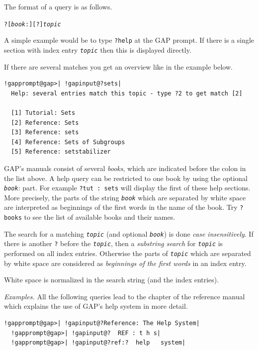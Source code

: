 \documentclass[a4paper,11pt]{report}
\begin{document}
{{ The format of a query is as follows. 

 \texttt{?[\mbox{\texttt{\mdseries\slshape book}}:][?]\mbox{\texttt{\mdseries\slshape topic}}} 

 A simple example would be to type \texttt{?help} at the \textsf{GAP} prompt. If there is a single section with index entry \mbox{\texttt{\mdseries\slshape topic}} then this is displayed directly. 

 If there are several matches you get an overview like in the example below. 

 
\begin{Verbatim}[commandchars=!@|,fontsize=\small,frame=single,label=Example]
  !gapprompt@gap>| !gapinput@?sets|
  Help: several entries match this topic - type ?2 to get match [2]
  
  [1] Tutorial: Sets
  [2] Reference: Sets
  [3] Reference: sets
  [4] Reference: Sets of Subgroups
  [5] Reference: setstabilizer
\end{Verbatim}
 

 \textsf{GAP}'s manuals consist of several \emph{books}, which are indicated before the colon in the list above. A help query can be
restricted to one book by using the optional \mbox{\texttt{\mdseries\slshape book}}: part. For example \texttt{?tut : sets} will display the first of these help sections. More precisely, the parts of
the string \mbox{\texttt{\mdseries\slshape book}} which are separated by white space are interpreted as beginnings of the first
words in the name of the book. Try \texttt{?books} to see the list of available books and their names. 

 The search for a matching \mbox{\texttt{\mdseries\slshape topic}} (and optional \mbox{\texttt{\mdseries\slshape book}}) is done \emph{case insensitively}. If there is another \texttt{?} before the \mbox{\texttt{\mdseries\slshape topic}}, then a \emph{substring search} for \mbox{\texttt{\mdseries\slshape topic}} is performed on all index entries. Otherwise the parts of \mbox{\texttt{\mdseries\slshape topic}} which are separated by white space are considered as \emph{beginnings of the first words} in an index entry. 

 White space is normalized in the search string (and the index entries). 

 \emph{Examples.} All the following queries lead to the chapter of the reference manual which
explains the use of \textsf{GAP}'s help system in more detail. 

 
\begin{Verbatim}[commandchars=!@|,fontsize=\small,frame=single,label=Example]
  !gapprompt@gap>| !gapinput@?Reference: The Help System|
  !gapprompt@gap>| !gapinput@?  REF : t h s|
  !gapprompt@gap>| !gapinput@?ref:?  help   system|
\end{Verbatim}
 

}}
\end{document}
